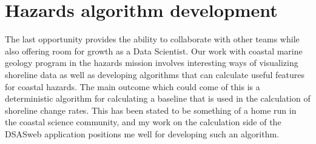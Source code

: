 \documentclass{article}
\begin{document}
\section{Hazards algorithm development}

The last opportunity provides the ability to collaborate with other teams while also offering room for growth as a Data Scientist.
Our work with coastal marine geology program in the hazards mission involves interesting ways of visualizing shoreline data as well as developing algorithms that can calculate useful features for coastal hazards.
The main outcome which could come of this is a deterministic algorithm for calculating a baseline that is used in the calculation of shoreline change rates.
This has been stated to be something of a home run in the coastal science community, and my work on the calculation side of the DSASweb application positions me well for developing such an algorithm.
\end{document}
